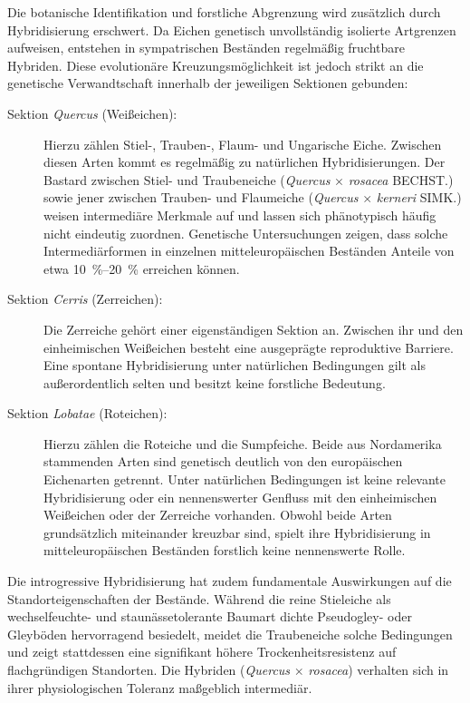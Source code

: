 \documentclass[twocolumn, bibliography=totoc, abstract=true]{scrartcl}
\begin{document}
Die botanische Identifikation und forstliche Abgrenzung wird zusätzlich durch Hybridisierung erschwert. Da Eichen genetisch unvollständig isolierte Artgrenzen aufweisen, entstehen in sympatrischen Beständen regelmäßig fruchtbare Hybriden. Diese evolutionäre Kreuzungsmöglichkeit ist jedoch strikt an die genetische Verwandtschaft innerhalb der jeweiligen Sektionen gebunden:

\begin{description}
\item[Sektion \textit{Quercus} (Weißeichen):] Hierzu zählen Stiel-, Trauben-, Flaum- und Ungarische Eiche. Zwischen diesen Arten kommt es regelmäßig zu natürlichen Hybridisierungen. Der Bastard zwischen Stiel- und Traubeneiche (\textit{Quercus} $\times$ \textit{rosacea} BECHST.) sowie jener zwischen Trauben- und Flaumeiche (\textit{Quercus} $\times$ \textit{kerneri} SIMK.) weisen intermediäre Merkmale auf und lassen sich phänotypisch häufig nicht eindeutig zuordnen. Genetische Untersuchungen zeigen, dass solche Intermediärformen in einzelnen mitteleuropäischen Beständen Anteile von etwa \qtyrange{10}{20}{\%} erreichen können.
\item[Sektion \textit{Cerris} (Zerreichen):] Die Zerreiche gehört einer eigenständigen Sektion an. Zwischen ihr und den einheimischen Weißeichen besteht eine ausgeprägte reproduktive Barriere. Eine spontane Hybridisierung unter natürlichen Bedingungen gilt als außerordentlich selten und besitzt keine forstliche Bedeutung.
\item[Sektion \textit{Lobatae} (Roteichen):] Hierzu zählen die Roteiche und die Sumpfeiche. Beide aus Nordamerika stammenden Arten sind genetisch deutlich von den europäischen Eichenarten getrennt. Unter natürlichen Bedingungen ist keine relevante Hybridisierung oder ein nennenswerter Genfluss mit den einheimischen Weißeichen oder der Zerreiche vorhanden. Obwohl beide Arten grundsätzlich miteinander kreuzbar sind, spielt ihre Hybridisierung in mitteleuropäischen Beständen forstlich keine nennenswerte Rolle.
\end{description}

Die introgressive Hybridisierung hat zudem fundamentale Auswirkungen auf die Standorteigenschaften der Bestände. Während die reine Stieleiche als wechselfeuchte- und staunässetolerante Baumart dichte Pseudogley- oder Gleyböden hervorragend besiedelt, meidet die Traubeneiche solche Bedingungen und zeigt stattdessen eine signifikant höhere Trockenheitsresistenz auf flachgründigen Standorten. Die Hybriden (\textit{Quercus} $\times$ \textit{rosacea}) verhalten sich in ihrer physiologischen Toleranz maßgeblich intermediär. 
\end{document}
